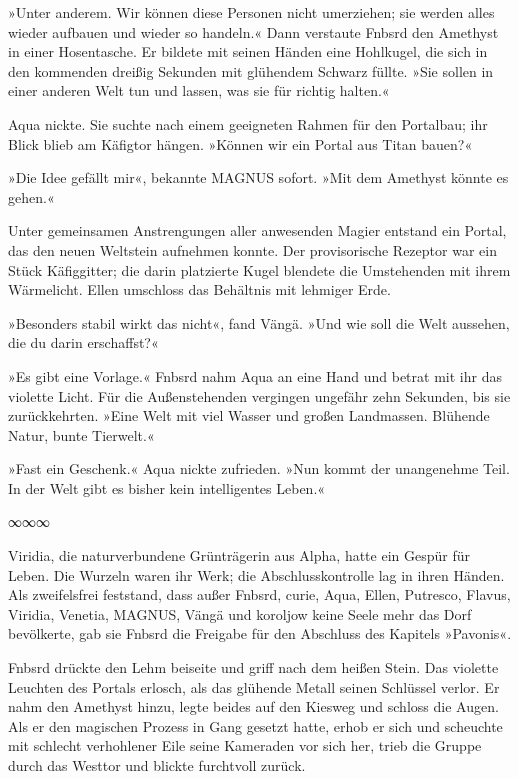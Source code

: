 »Unter anderem. Wir können diese Personen nicht umerziehen; sie werden alles wieder aufbauen und wieder so handeln.« Dann verstaute Fnbsrd den Amethyst in einer Hosentasche. Er bildete mit seinen Händen eine Hohlkugel, die sich in den kommenden dreißig Sekunden mit glühendem Schwarz füllte. »Sie sollen in einer anderen Welt tun und lassen, was sie für richtig halten.«

Aqua nickte. Sie suchte nach einem geeigneten Rahmen für den Portalbau; ihr Blick blieb am Käfigtor hängen. »Können wir ein Portal aus Titan bauen?«

»Die Idee gefällt mir«, bekannte MAGNUS sofort. »Mit dem Amethyst könnte es gehen.«

Unter gemeinsamen Anstrengungen aller anwesenden Magier entstand ein Portal, das den neuen Weltstein aufnehmen konnte. Der provisorische Rezeptor war ein Stück Käfiggitter; die darin platzierte Kugel blendete die Umstehenden mit ihrem Wärmelicht. Ellen umschloss das Behältnis mit lehmiger Erde.

»Besonders stabil wirkt das nicht«, fand Vängä. »Und wie soll die Welt aussehen, die du darin erschaffst?«

»Es gibt eine Vorlage.« Fnbsrd nahm Aqua an eine Hand und betrat mit ihr das violette Licht. Für die Außenstehenden vergingen ungefähr zehn Sekunden, bis sie zurückkehrten. »Eine Welt mit viel Wasser und großen Landmassen. Blühende Natur, bunte Tierwelt.«

»Fast ein Geschenk.« Aqua nickte zufrieden. »Nun kommt der unangenehme Teil. In der Welt gibt es bisher kein intelligentes Leben.«

\begin{center}
∞∞∞
\end{center}

Viridia, die naturverbundene Grünträgerin aus Alpha, hatte ein Gespür für Leben. Die Wurzeln waren ihr Werk; die Abschlusskontrolle lag in ihren Händen. Als zweifelsfrei feststand, dass außer Fnbsrd, curie, Aqua, Ellen, Putresco, Flavus, Viridia, Venetia, MAGNUS, Vängä und koroljow keine Seele mehr das Dorf bevölkerte, gab sie Fnbsrd die Freigabe für den Abschluss des Kapitels »Pavonis«.

Fnbsrd drückte den Lehm beiseite und griff nach dem heißen Stein. Das violette Leuchten des Portals erlosch, als das glühende Metall seinen Schlüssel verlor. Er nahm den Amethyst hinzu, legte beides auf den Kiesweg und schloss die Augen. Als er den magischen Prozess in Gang gesetzt hatte, erhob er sich und scheuchte mit schlecht verhohlener Eile seine Kameraden vor sich her, trieb die Gruppe durch das Westtor und blickte furchtvoll zurück.

